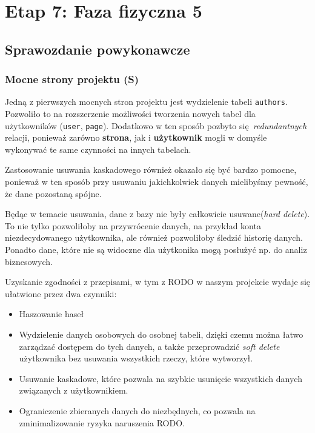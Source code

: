 \documentclass{article}
\begin{document}
\newpage

\section{Etap 7: Faza fizyczna 5}

\subsection{Sprawozdanie powykonawcze}

\subsubsection{Mocne strony projektu (S)}


Jedną z pierwszych mocnych stron projektu jest wydzielenie tabeli \texttt{authors}. Pozwoliło to na rozszerzenie możliwości tworzenia nowych tabel dla użytkowników (\texttt{user}, \texttt{page}). Dodatkowo w ten sposób pozbyto się \textit{redundantnych} relacji, ponieważ zarówno \textbf{strona}, jak i \textbf{użytkownik} mogli w domyśle wykonywać te same czynności na innych tabelach.

Zastosowanie usuwania kaskadowego również okazało się być bardzo pomocne, ponieważ w ten sposób przy usuwaniu jakichkolwiek danych mielibyśmy pewność, że dane pozostaną spójne.

Będąc w temacie usuwania, dane z bazy nie były całkowicie usuwane(\textit{hard delete}). To nie tylko pozwoliłoby na przywrócenie danych, na przykład konta niezdecydowanego użytkownika, ale również pozwoliłoby śledzić historię danych. Ponadto dane, które nie są widoczne dla użytkonika mogą posłużyć np. do analiz biznesowych.

Uzyskanie zgodności z przepisami, w tym z RODO w naszym projekcie wydaje się ułatwione przez dwa czynniki:
\begin{itemize}
    \item Haszowanie haseł
    \item Wydzielenie danych osobowych do osobnej tabeli, dzięki czemu można łatwo zarządzać dostępem do tych danych, a także przeprowadzić \textit{soft delete} użytkownika bez usuwania wszystkich rzeczy, które wytworzył.
    \item Usuwanie kaskadowe, które pozwala na szybkie usunięcie wszystkich danych związanych z użytkownikiem.
    \item Ograniczenie zbieranych danych do niezbędnych, co pozwala na zminimalizowanie ryzyka naruszenia RODO.
\end{itemize}
\end{document}
